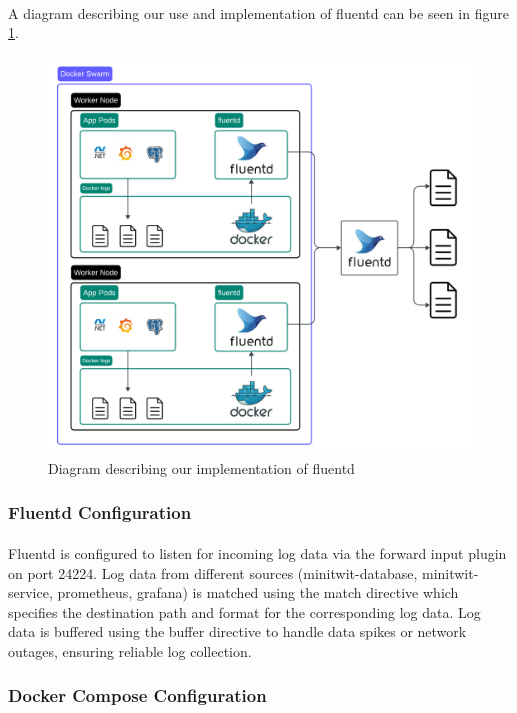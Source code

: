 \paragraph{} A diagram describing our use and implementation of fluentd can be seen in figure \ref{fig:logging2}.
\begin{figure}[H]
	\centering
	\includegraphics[width=1\textwidth]{Logging2.png}
	\caption{Diagram describing our implementation of fluentd}
	\label{fig:logging2}
\end{figure}

\subsubsection*{Fluentd Configuration}
\paragraph{} Fluentd is configured to listen for incoming log data via the forward input plugin on port 24224. Log data from different sources  (minitwit-database, minitwit-service, prometheus, grafana) is matched using the match directive which specifies the destination path and format for the corresponding log data. Log data is buffered using the buffer directive to handle data spikes or network outages, ensuring reliable log collection.

\subsubsection*{Docker Compose Configuration}
